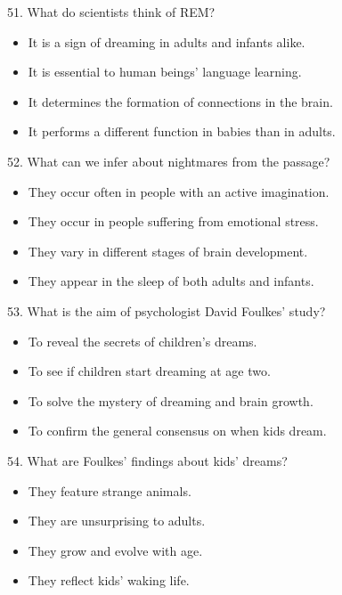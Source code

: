 \documentclass[UTF8,11pt]{ctexart}
\begin{document}
51. What do scientists think of REM?


\begin{itemize}[leftmargin=2em,itemsep=.2em,topsep=.4em]\item[A.] It is a sign of dreaming in adults and infants alike.
\item[B.] It is essential to human beings’ language learning.
\item[C.] It determines the formation of connections in the brain.
\item[D.] It performs a different function in babies than in adults.
\end{itemize}

52. What can we infer about nightmares from the passage?


\begin{itemize}[leftmargin=2em,itemsep=.2em,topsep=.4em]\item[A.] They occur often in people with an active imagination.
\item[B.] They occur in people suffering from emotional stress.
\item[C.] They vary in different stages of brain development.
\item[D.] They appear in the sleep of both adults and infants.
\end{itemize}

53. What is the aim of psychologist David Foulkes’ study?


\begin{itemize}[leftmargin=2em,itemsep=.2em,topsep=.4em]\item[A.] To reveal the secrets of children’s dreams.
\item[B.] To see if children start dreaming at age two.
\item[C.] To solve the mystery of dreaming and brain growth.
\item[D.] To confirm the general consensus on when kids dream.
\end{itemize}

54. What are Foulkes’ findings about kids’ dreams?


\begin{itemize}[leftmargin=2em,itemsep=.2em,topsep=.4em]\item[A.] They feature strange animals.
\item[B.] They are unsurprising to adults.
\item[C.] They grow and evolve with age.
\item[D.] They reflect kids’ waking life.
\end{itemize}
\end{document}
